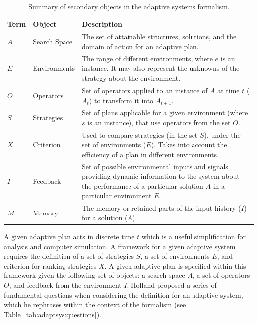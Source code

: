 \begin{table}[ht]
	\centering\small
		\begin{tabularx}{\textwidth}{llX}
		\toprule
		\textbf{Term} & \textbf{Object} & \textbf{Description} \\ 
		\toprule
		$A$ & Search Space & The set of attainable structures, solutions, and the domain of action for an adaptive plan. \\ 
		\midrule
		$E$ & Environments & The range of different environments, where $e$ is an instance. It may also represent the unknowns of the strategy about the environment.  \\ 
		\midrule
		$O$ & Operators & Set of operators applied to an instance of $A$ at time $t$ ($A_t$) to transform it into $A_{t+1}$. \\ 
		\midrule
		$S$ & Strategies & Set of plans applicable for a given environment (where $s$ is an instance), that use operators from the set $O$.  \\ 
		\midrule
		$X$ & Criterion & Used to compare strategies (in the set $S$), under the set of environments ($E$). Takes into account the efficiency of a plan in different environments. \\ 
		\midrule
		$I$ & Feedback & Set of possible environmental inputs and signals providing dynamic information to the system about the performance of a particular solution $A$ in a particular environment $E$. \\ 
		\midrule
		$M$ & Memory & The memory or retained parts of the input history ($I$) for a solution ($A$). \\ 
		\bottomrule		
		\end{tabularx}	
	\caption{Summary of secondary objects in the adaptive systems formalism.}
	\label{tab:adaptsys:secondary}
\end{table}

A given adaptive plan acts in discrete time $t$ which is a useful simplification for analysis and computer simulation. A framework for a given adaptive system requires the definition of a set of strategies $S$, a set of environments $E$, and criterion for ranking strategies $X$. A given adaptive plan is specified within this framework given the following set of objects: a search space $A$, a set of operators $O$, and feedback from the environment $I$. Holland proposed a series of fundamental questions when considering the definition for an adaptive system, which he rephrases within the context of the formalism (see Table~\ref{tab:adaptsys:questions}).

